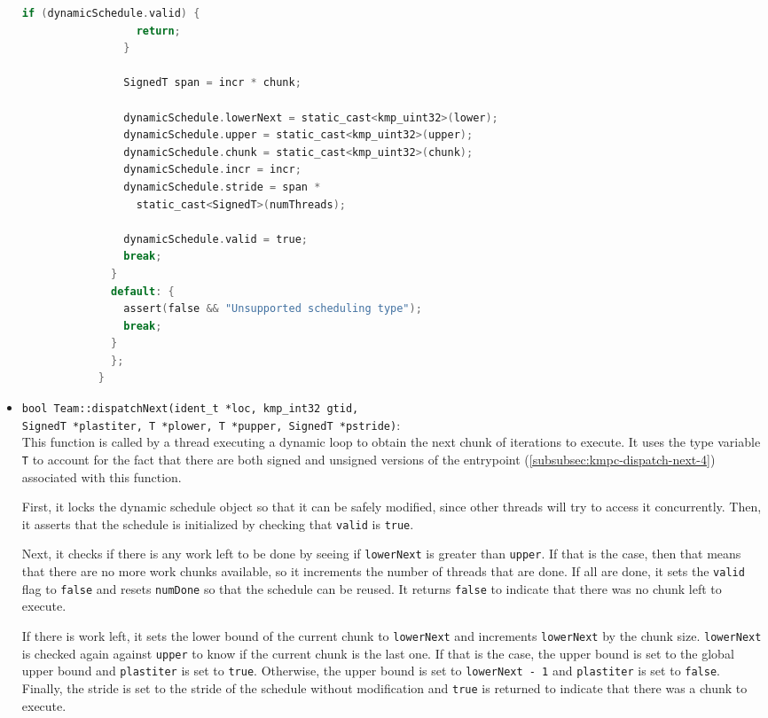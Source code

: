 \begin{itemize}
\begin{lstlisting}[language=C, caption={void Team::dispatchInit},
          label={lst:team-dispatchinit}, escapechar=@]
                if (dynamicSchedule.valid) {
                  return;
                }

                SignedT span = incr * chunk;

                dynamicSchedule.lowerNext = static_cast<kmp_uint32>(lower);
                dynamicSchedule.upper = static_cast<kmp_uint32>(upper);
                dynamicSchedule.chunk = static_cast<kmp_uint32>(chunk);
                dynamicSchedule.incr = incr;
                dynamicSchedule.stride = span *
                  static_cast<SignedT>(numThreads);

                dynamicSchedule.valid = true;
                break;
              }
              default: {
                assert(false && "Unsupported scheduling type");
                break;
              }
              };
            }
          \end{lstlisting}

	\item \texttt{bool Team::dispatchNext(ident_t *loc, kmp_int32 gtid,\\SignedT *plastiter, T *plower, T
		      *pupper, SignedT *pstride)}:\\ This function is called by a thread executing a dynamic
	      loop to obtain the next chunk of iterations to execute. It uses the type variable
	      \texttt{T} to account for the fact that there are both signed and unsigned versions of
	      the entrypoint (\cref{subsubsec:kmpc-dispatch-next-4}) associated with this function.

	      First, it locks the dynamic schedule object so that it can be safely modified, since
	      other threads will try to access it concurrently. Then, it asserts that the schedule
	      is initialized by checking that \texttt{valid} is \texttt{true}.

	      Next, it checks if there is any work left to be done by seeing if \texttt{lowerNext}
	      is greater than \texttt{upper}. If that is the case, then that means that there are no
	      more work chunks available, so it increments the number of threads that are done. If
	      all are done, it sets the \texttt{valid} flag to \texttt{false} and resets
	      \texttt{numDone} so that the schedule can be reused. It returns \texttt{false} to
	      indicate that there was no chunk left to execute.

	      If there is work left, it sets the lower bound of the current chunk to \texttt{lowerNext}
	      and increments \texttt{lowerNext} by the chunk size. \texttt{lowerNext} is checked
	      again against \texttt{upper} to know if the current chunk is the last one. If that is
	      the case, the upper bound is set to the global upper bound and \texttt{plastiter} is
	      set to \texttt{true}. Otherwise, the upper bound is set to \texttt{lowerNext - 1} and
	      \texttt{plastiter} is set to \texttt{false}. Finally, the stride is set to the stride
	      of the schedule without modification and \texttt{true} is returned to indicate that
	      there was a chunk to execute.


\end{itemize}
